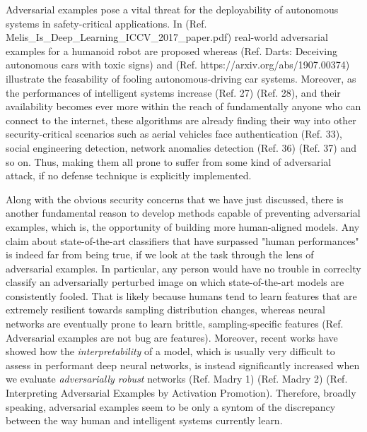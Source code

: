 \documentclass[LaM,binding=0.6cm]{./packages/sapthesis/sapthesis}
\begin{document}
        Adversarial examples pose a vital threat for the deployability of autonomous systems in safety-critical applications. In (Ref. Melis\_Is\_Deep\_Learning\_ICCV\_2017\_paper.pdf) real-world adversarial examples for 
        a humanoid robot are proposed whereas (Ref. Darts: Deceiving autonomous cars with toxic signs) and (Ref. https://arxiv.org/abs/1907.00374) illustrate the feasability of fooling autonomous-driving car systems.
        Moreover, as the performances of intelligent systems increase (Ref. 27) (Ref. 28), and their availability becomes ever more within the reach of fundamentally anyone who can connect to the internet, these algorithms 
        are already finding their way into other security-critical scenarios such as aerial vehicles face authentication (Ref. 33), social engineering detection, network anomalies detection (Ref. 36) (Ref. 37) and so on. 
        Thus, making them all prone to suffer from some kind of adversarial attack, if no defense technique is explicitly implemented.
        
        Along with the obvious security concerns that we have just discussed, there is another fundamental reason to develop methods capable of preventing adversarial examples, which is, the opportunity of 
        building more human-aligned models. Any claim about state-of-the-art classifiers that have surpassed "human performances" is indeed far from being true, if we look at the task through the lens of adversarial examples.
        In particular, any person would have no trouble in correclty classify an adversarially perturbed image on which state-of-the-art models are consistently fooled. That is likely because humans tend to learn features that are 
        extremely resilient towards sampling distribution changes, whereas neural networks are eventually prone to learn brittle, sampling-specific features (Ref. Adversarial examples are not bug are features).
        Moreover, recent works have showed how the \textit{interpretability} of a model, which is usually very difficult to assess in performant deep neural networks, is instead significantly increased 
        when we evaluate \textit{adversarially robust} networks (Ref. Madry 1) (Ref. Madry 2) (Ref. Interpreting Adversarial Examples by Activation Promotion). Therefore, broadly speaking, adversarial examples 
        seem to be only a syntom of the discrepancy between the way human and intelligent systems currently learn.
\end{document}
